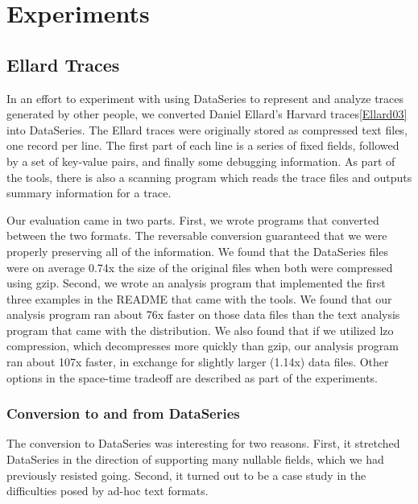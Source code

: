 \documentclass[twocolumn, 11pt]{article}
\begin{document}
\section{Experiments}

\subsection{Ellard Traces}

In an effort to experiment with using DataSeries to represent and
analyze traces generated by other people, we converted Daniel Ellard's
Harvard traces\ref{Ellard03} into DataSeries.  The Ellard traces
were originally stored as compressed text files, one record per line.
The first part of each line is a series of fixed fields, followed by a
set of key-value pairs, and finally some debugging information.  As
part of the tools, there is also a scanning program which reads the
trace files and outputs summary information for a trace.

Our evaluation came in two parts.  First, we wrote programs that
converted between the two formats.  The reversable conversion
guaranteed that we were properly preserving all of the information.
We found that the DataSeries files were on average 0.74x the size of
the original files when both were compressed using gzip.  Second, we
wrote an analysis program that implemented the first three examples in
the README that came with the tools.  We found that our analysis
program ran about 76x faster on those data files than the text
analysis program that came with the distribution.  
We also found that if we utilized lzo compression, which decompresses
more quickly than gzip,
our analysis program
ran about 107x faster, in exchange for slightly larger (1.14x) data files.
Other options in the space-time
tradeoff are described as part of the experiments.

\subsubsection{Conversion to and from DataSeries}

The conversion to DataSeries was interesting for two reasons.  First,
it stretched DataSeries in the direction of supporting many nullable
fields, which we had previously resisted going.  Second, it turned out
to be a case study in the difficulties posed by ad-hoc text formats.
\end{document}
